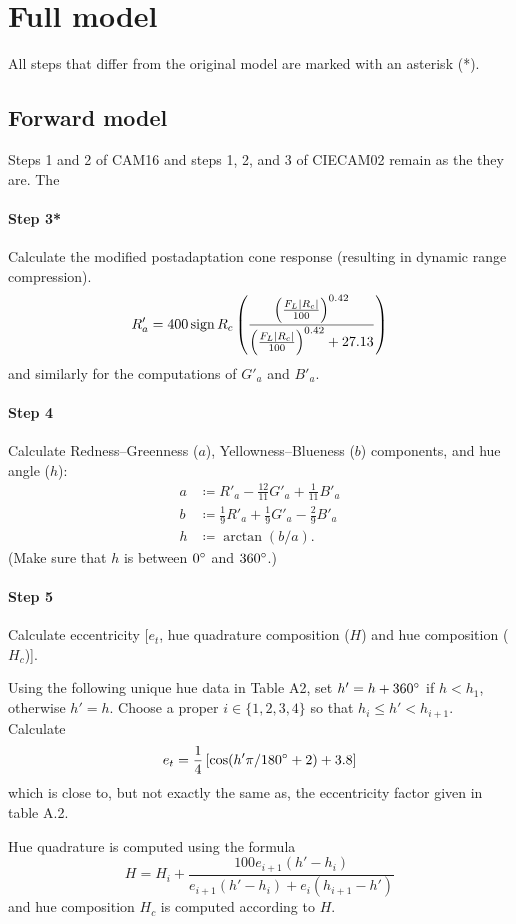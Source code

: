 \documentclass[twocolumn]{scrartcl}
\DeclarePairedDelimiter\abs{\lvert}{\rvert}%
\DeclareMathOperator{\sign}{sign}
\begin{document}
\section{Full model}

All steps that differ from the original model are marked with an asterisk (*).

\subsection{Forward model}

Steps 1 and 2 of CAM16 and steps 1, 2, and 3 of CIECAM02 remain as the they are.
The

\paragraph{Step 3*}{%
Calculate the modified postadaptation cone response
(resulting in dynamic range compression).
\[
  R'_a = 400 \sign{R_c} \left(\frac{\left(\frac{F_L \abs{R_c}}{100}\right)^{0.42}}{\left(\frac{F_L \abs{R_c}}{100}\right)^{0.42} + 27.13}\right)
\]
and similarly for the computations of $G'_a$ and $B'_a$.
}

\paragraph{Step 4}{%
  Calculate Redness--Greenness ($a$), Yellowness--Blueness ($b$) components,
  and hue angle ($h$):
  \begin{align*}
    a&\coloneqq R'_a - \frac{12}{11} G'_a + \frac{1}{11} B'_a\\
    b&\coloneqq \frac{1}{9} R'_a + \frac{1}{9} G'_a - \frac{2}{9} B'_a\\
    h&\coloneqq \arctan(b/a).
  \end{align*}
  (Make sure that $h$ is between $0\degree$ and $360\degree$.)
}

\paragraph{Step 5}{%
  Calculate eccentricity [$e_t$, hue quadrature composition
($H$) and hue composition ($H_c$)].

Using the following unique hue data in Table A2, set
$h'= h + 360\degree$ if $h < h_1$, otherwise $h'=h$.
Choose a proper $i\in\{1,2,3,4\}$ so that $h_i\le h' < h_{i+1}$.
Calculate
\[
  e_t = \frac{1}{4}
  \left[
    \cos(h'\pi/180\degree + 2) + 3.8
  \right]
\]
which is close to, but not exactly the same as, the eccentricity factor given
in table A.2.

Hue quadrature is computed using the formula
\[
  H = H_i + \frac{100 e_{i+1} (h'-h_i)}{e_{i+1}(h'-h_i) + e_i (h_{i+1}-h')}
  \]
and hue composition $H_c$ is computed according to $H$. %
  }
\end{document}
